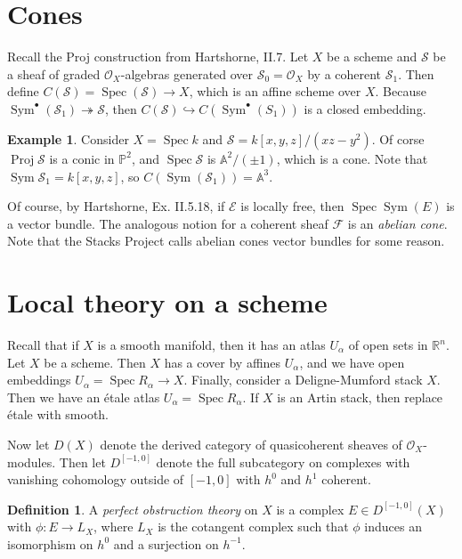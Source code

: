\documentclass[leqno, openany]{memoir}
\theoremstyle{definition}
\newtheorem{defn}[thm]{Definition}
\newtheorem{exm}[thm]{Example}
\theoremstyle{remark}
\theoremstyle{plain}
\theoremstyle{definition}
\theoremstyle{remark}
\newcommand{\A}{\mathbb{A}}
\newcommand{\R}{\mathbb{R}}
\renewcommand{\P}{\mathbb{P}}
\newcommand{\mc}[1]{\mathcal{#1}}
\newcommand{\on}[1]{\operatorname{#1}}
\DeclareMathOperator{\Spec}{Spec}
\DeclareMathOperator{\Proj}{Proj}
\begin{document}
\section{Cones}
Recall the Proj construction from Hartshorne, II.7. Let $X$ be a scheme and $\mc{S}$ be a sheaf of graded $\mc{O}_X$-algebras generated over $\mc{S}_0 = \mc{O}_X$ by a coherent $\mc{S}_1$. Then define $C(\mc{S}) = \Spec (\mc{S}) \to X$, which is an affine scheme over $X$. Because $\on{Sym}^{\bullet} (\mc{S}_1) \twoheadrightarrow \mc{S}$, then $C(\mc{S}) \hookrightarrow C(\on{Sym}^{\bullet} (S_1))$ is a closed embedding.

\begin{exm}
    Consider $X = \Spec k$ and $\mc{S} = k[x,y,z]/(xz-y^2)$. Of corse $\Proj \mc{S}$ is a conic in $\P^2$, and $\Spec \mc{S}$ is $\A^2 / (\pm 1)$, which is a cone. Note that $\on{Sym} \mc{S}_1 = k[x,y,z]$, so $C(\on{Sym}(\mc{S}_1)) = \A^3$.
\end{exm}

Of course, by Hartshorne, Ex. II.5.18, if $\mc{E}$ is locally free, then $\Spec \on{Sym}(E)$ is a vector bundle. The analogous notion for a coherent sheaf $\mc{F}$ is an \textit{abelian cone}. Note that the Stacks Project calls abelian cones vector bundles for some reason.

\section{Local theory on a scheme}
Recall that if $X$ is a smooth manifold, then it has an atlas $U_{\alpha}$ of open sets in $\R^n$. Let $X$ be a scheme. Then $X$ has a cover by affines $U_{\alpha}$, and we have open embeddings $U_{\alpha} = \Spec R_{\alpha} \to X$. Finally, consider a Deligne-Mumford stack $X$. Then we have an \'etale atlas $U_{\alpha} = \Spec R_{\alpha}$. If $X$ is an Artin stack, then replace \'etale with smooth.

Now let $D(X)$ denote the derived category of quasicoherent sheaves of $\mc{O}_X$-modules. Then let $D^{[-1,0]}$ denote the full subcategory on complexes with vanishing cohomology outside of $[-1,0]$ with $h^0$ and $h^1$ coherent.
\begin{defn}
    A \textit{perfect obstruction theory} on $X$ is a complex $E \in D^{[-1,0]}(X)$ with $\phi \colon E \to L_X$, where $L_X$ is the cotangent complex such that $\phi$ induces an isomorphism on $h^0$ and a surjection on $h^{-1}$.
\end{defn}
\end{document}
